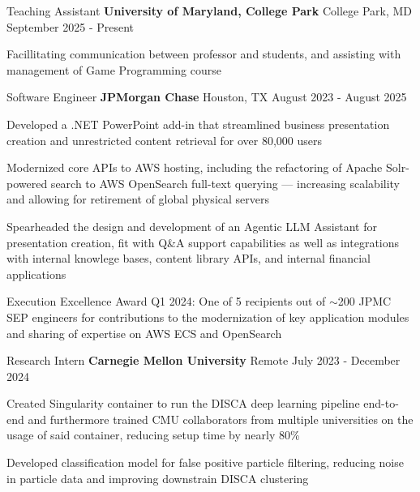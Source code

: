 
\begin{cventries}


  \cventry
    {Teaching Assistant}
    {\textbf{University of Maryland, College Park}}
    {College Park, MD}
    {September 2025 - Present}
    {
      \begin{cvitems}
        \item{Facillitating communication between professor and students, and assisting with management of Game Programming course}
      \end{cvitems}
    }

  \cventry
    {Software Engineer}
    {\textbf{JPMorgan Chase}}
    {Houston, TX}
    {August 2023 - August 2025}
    {
      \begin{cvitems}
        \item{Developed a .NET PowerPoint add-in that streamlined business presentation creation and unrestricted content retrieval for over 80,000 users}
        \item{Modernized core APIs to AWS hosting, including the refactoring of Apache Solr-powered search to AWS OpenSearch full-text querying --- increasing scalability and allowing for retirement of global physical servers}
        \item{Spearheaded the design and development of an Agentic LLM Assistant for presentation creation, fit with Q\&A support capabilities as well as integrations with internal knowlege bases, content library APIs, and internal financial applications}
        \item{Execution Excellence Award Q1 2024: One of 5 recipients out of $\sim$200 JPMC SEP engineers for contributions to the modernization of key application modules and sharing of expertise on AWS ECS and OpenSearch}
      \end{cvitems}
    }

  \cventry
    {Research Intern}
    {\textbf{Carnegie Mellon University}}
    {Remote}
    {July 2023 - December 2024}
    {
      \begin{cvitems}
        \item{Created Singularity container to run the DISCA deep learning pipeline end-to-end and furthermore trained CMU collaborators from multiple universities on the usage of said container, reducing setup time by nearly 80\%}
        \item{Developed classification model for false positive particle filtering, reducing noise in particle data and improving downstrain DISCA clustering}
      \end{cvitems}
    }


\end{cventries}
